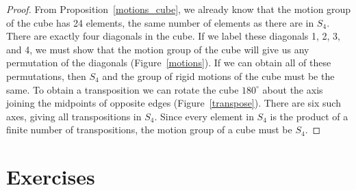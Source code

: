  

 
\begin{proof}
From Proposition~\ref{motions_cube}, we already know that the motion group of the
cube has 24 elements, the same number of elements as there are in
$S_4$.  There are exactly four diagonals in the cube.  If we label
these diagonals 1, 2, 3, and 4, we must show that the motion group of
the cube will give us any permutation of the diagonals
(Figure~\ref{motions}). If we can obtain all of these permutations,
then $S_4$ and the group of rigid motions of the cube must be the
same. To obtain a transposition we can rotate the cube $180^{\circ}$
about the axis joining the midpoints of opposite edges
(Figure~\ref{transpose}). There are six such axes, giving all
transpositions in $S_4$. Since every element in $S_4$ is the product
of a finite number of transpositions, the motion group of a cube
must be $S_4$.
\hspace*{1in}
\end{proof}
 

 
 
\section*{Exercises}
\exrule
 
 
 
